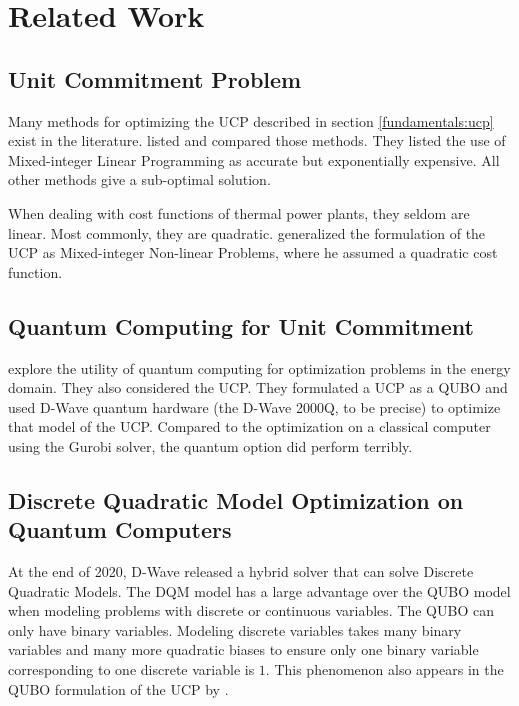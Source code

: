 \section{Related Work}

\subsection{Unit Commitment Problem}

Many methods for optimizing the UCP described in section \ref{fundamentals:ucp} exist in the literature.
\citeauthor{Abujarad2017} listed and compared those methods.
They listed the use of Mixed-integer Linear Programming as accurate but exponentially expensive.
All other methods give a sub-optimal solution.
\cite{Abujarad2017}

When dealing with cost functions of thermal power plants, they seldom are linear.
Most commonly, they are quadratic.
\citeauthor{Baldick1995} generalized the formulation of the UCP as Mixed-integer Non-linear Problems, where he assumed a quadratic cost function.
\cite{Baldick1995}

\subsection{Quantum Computing for Unit Commitment}

\citeauthor{Ajagekar2019} explore the utility of quantum computing for optimization problems in the energy domain.
They also considered the UCP.
They formulated a UCP as a QUBO and used D-Wave quantum hardware (the D-Wave 2000Q, to be precise) to optimize that model of the UCP.
Compared to the optimization on a classical computer using the Gurobi solver, the quantum option did perform terribly.
\cite{Ajagekar2019}

\subsection{Discrete Quadratic Model Optimization on Quantum Computers}

At the end of 2020, D-Wave released a hybrid solver that can solve Discrete Quadratic Models.
\cite{DQMHybrid2020}
The DQM model has a large advantage over the QUBO model when modeling problems with discrete or continuous variables.
The QUBO can only have binary variables.
Modeling discrete variables takes many binary variables and many more quadratic biases to ensure only one binary variable corresponding to one discrete variable is $1$.
This phenomenon also appears in the QUBO formulation of the UCP by \citeauthor{Ajagekar2019}.
\cite{Ajagekar2019}
